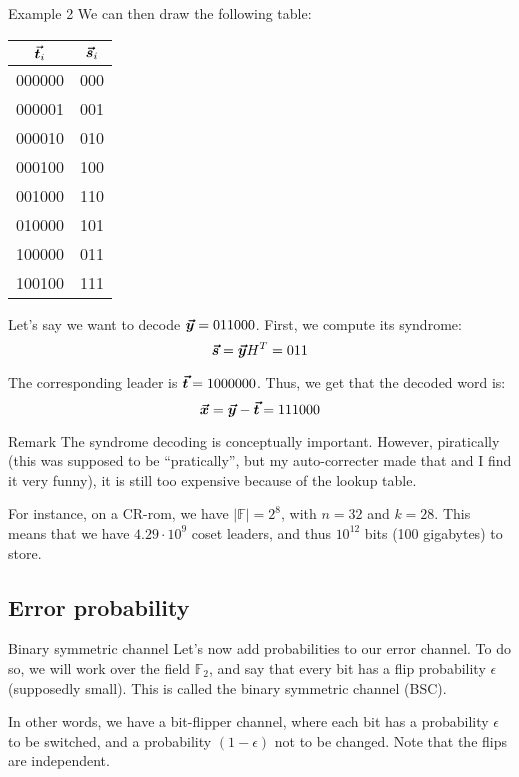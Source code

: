 \documentclass[a4paper]{article}
\begin{document}
\begin{parag}{Example 2}
    We can then draw the following table:
    \begin{center}
    \begin{tabular}{c|c}
        $\bm{\protect\vec{t}}_i$ & $\bm{\protect\vec{s}}_i$ \\
        \hline
        000000 & 000 \\
        000001 & 001 \\
        000010 & 010 \\
        000100 & 100 \\
        001000 & 110 \\
        010000 & 101 \\
        100000 & 011 \\
        100100 & 111
    \end{tabular}
    \end{center}
    
    Let's say we want to decode $\bm{\protect\vec{y}} = 011000$. First, we compute its syndrome: 
    \[\bm{\protect\vec{s}} = \bm{\protect\vec{y}} H^T = 011\]

    The corresponding leader is $\bm{\protect\vec{t}} = 1000000$. Thus, we get that the decoded word is: 
    \[\bm{\protect\vec{x}} = \bm{\protect\vec{y}} - \bm{\protect\vec{t}} = 111000\]
\end{parag}

\begin{parag}{Remark}
    The syndrome decoding is conceptually important. However, piratically (this was supposed to be ``pratically'', but my auto-correcter made that and I find it very funny), it is still too expensive because of the lookup table.

    For instance, on a CR-rom, we have $\left|\mathbb{F}\right| = 2^8$, with $n = 32$ and $k = 28$. This means that we have $4.29 \cdot 10^9$ coset leaders, and thus $10^{12}$ bits (100 gigabytes) to store.
\end{parag}

\subsection{Error probability}

\begin{parag}{Binary symmetric channel}
    Let's now add probabilities to our error channel. To do so, we will work over the field $\mathbb{F}_2$, and say that every bit has a flip probability $\epsilon$ (supposedly small). This is called the binary symmetric channel (BSC). 

    In other words, we have a bit-flipper channel, where each bit has a probability $\epsilon$ to be switched, and a probability $\left(1 - \epsilon\right)$ not to be changed. Note that the flips are independent.

\end{parag}
\end{document}
